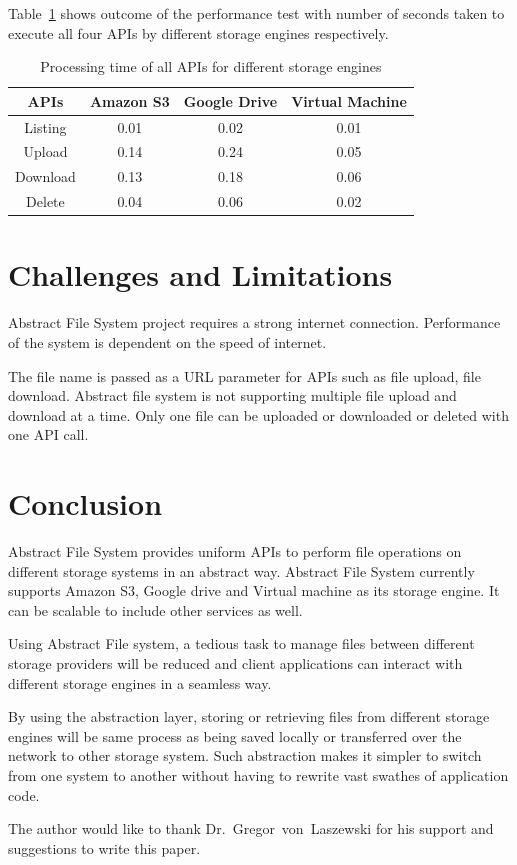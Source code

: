 Table~\ref{tab:timing} shows outcome of the performance test 
with number of seconds taken to execute all four APIs by different 
storage engines respectively.

\begin{table}[htb]
	\centering
  \caption{Processing time of all APIs for different storage 
  engines}\label{tab:timing}

	\begin{tabular}{*{4}{c}}
		\toprule
		APIs & Amazon S3 & Google Drive & Virtual Machine \\
		\midrule
		Listing & 0.01  & 0.02 & 0.01 \\
		Upload & 0.14 & 0.24 & 0.05 \\
        Download & 0.13 & 0.18 & 0.06 \\
        Delete & 0.04 & 0.06 & 0.02 \\
		\bottomrule
	\end{tabular}
\end{table}




\section{Challenges and Limitations}

Abstract File System project requires a strong internet connection. 
Performance of the system is dependent on the speed of internet. 

The file name is passed as a URL parameter for APIs such as file upload,
file download. Abstract file system is not supporting multiple file 
upload and download at a time. Only one file can be uploaded or 
downloaded or deleted with one API call. 


\section{Conclusion}
Abstract File System provides uniform APIs to perform file operations on 
different storage systems in an abstract way. Abstract File System currently 
supports Amazon S3, Google drive and Virtual machine as its storage engine. It 
can be scalable to include other services as well. 


Using Abstract File system, a tedious task to manage files between different 
storage providers will be reduced and client applications can interact with 
different storage engines in a seamless way. 


By using the abstraction layer, storing or retrieving files from different 
storage engines will be same process as being saved locally or transferred 
over the network to other storage system. Such abstraction makes it simpler to 
switch from one system to another without having to rewrite vast swathes of 
application code.



\begin{acks}

  The author would like to thank Dr.~Gregor~von~Laszewski for his
  support and suggestions to write this paper.

\end{acks}


 

